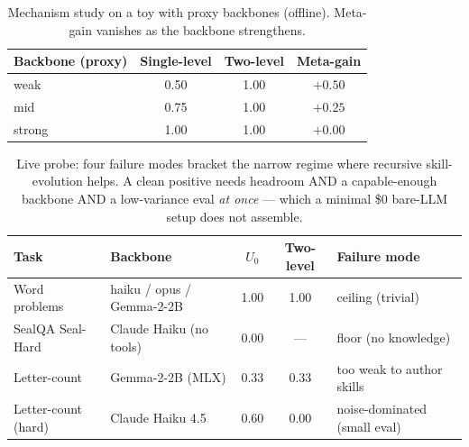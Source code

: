 \documentclass[11pt]{article}
\begin{document}
\begin{table}[h]\centering
\caption{Mechanism study on a toy with proxy backbones (offline). Meta-gain
vanishes as the backbone strengthens.}
\label{tab:law-toy}
\begin{tabular}{lccc}
\toprule
Backbone (proxy) & Single-level & Two-level & Meta-gain\\
\midrule
weak   & 0.50 & 1.00 & $+0.50$\\
mid    & 0.75 & 1.00 & $+0.25$\\
strong & 1.00 & 1.00 & $+0.00$\\
\bottomrule
\end{tabular}
\end{table}

\begin{table}[h]\centering
\caption{Live probe: four failure modes bracket the narrow regime where recursive
skill-evolution helps. A clean positive needs headroom AND a capable-enough backbone
AND a low-variance eval \emph{at once} --- which a minimal \$0 bare-LLM setup does
not assemble.}
\label{tab:law-live}
\begin{tabular}{llccl}
\toprule
Task & Backbone & $U_0$ & Two-level & Failure mode\\
\midrule
Word problems     & haiku / opus / Gemma-2-2B  & 1.00 & 1.00 & ceiling (trivial)\\
SealQA Seal-Hard  & Claude Haiku (no tools)    & 0.00 & ---  & floor (no knowledge)\\
Letter-count      & Gemma-2-2B (MLX)           & 0.33 & 0.33 & too weak to author skills\\
Letter-count (hard) & Claude Haiku 4.5         & 0.60 & 0.00 & noise-dominated (small eval)\\
\bottomrule
\end{tabular}
\end{table}
\end{document}
